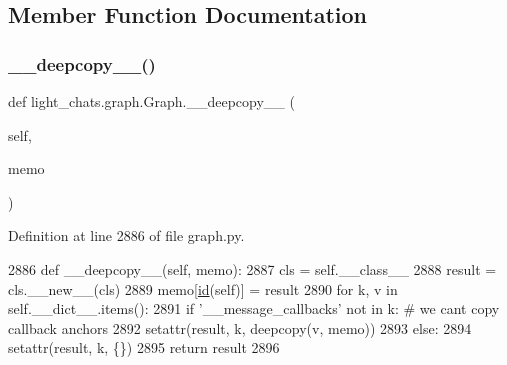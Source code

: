 \subsection{Member Function Documentation}
\mbox{\label{classlight__chats_1_1graph_1_1Graph_a1fc2b40195b1c7d3ed3a26dbd26fe79b}} 
\subsubsection{\texorpdfstring{\+\_\+\+\_\+deepcopy\+\_\+\+\_\+()}{\_\_deepcopy\_\_()}}
{\footnotesize\ttfamily def light\+\_\+chats.\+graph.\+Graph.\+\_\+\+\_\+deepcopy\+\_\+\+\_\+ (\begin{DoxyParamCaption}\item[{}]{self,  }\item[{}]{memo }\end{DoxyParamCaption})}



Definition at line 2886 of file graph.\+py.


\begin{DoxyCode}
2886     \textcolor{keyword}{def }\_\_deepcopy\_\_(self, memo):
2887         cls = self.\_\_class\_\_
2888         result = cls.\_\_new\_\_(cls)
2889         memo[\hyperlink{namespacegenerate__task__list_a78e725c3dd7e8fbdb5c3044ec1bc3a81}{id}(self)] = result
2890         \textcolor{keywordflow}{for} k, v \textcolor{keywordflow}{in} self.\_\_dict\_\_.items():
2891             \textcolor{keywordflow}{if} \textcolor{stringliteral}{'\_\_message\_callbacks'} \textcolor{keywordflow}{not} \textcolor{keywordflow}{in} k:  \textcolor{comment}{# we cant copy callback anchors}
2892                 setattr(result, k, deepcopy(v, memo))
2893             \textcolor{keywordflow}{else}:
2894                 setattr(result, k, \{\})
2895         \textcolor{keywordflow}{return} result
2896 
\end{DoxyCode}
\mbox{\label{classlight__chats_1_1graph_1_1Graph_a56d79ef43ac8f25d399228cc57f5fa25}} 
